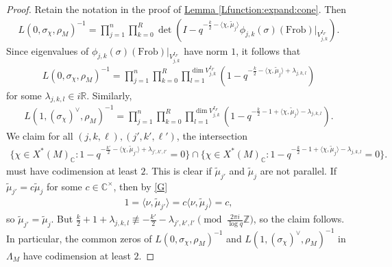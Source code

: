 \documentclass[10pt]{amsart}
\theoremstyle{definition}
\numberwithin{equation}{section}
\numberwithin{equation}{subsection}
\newcommand{\ZZ}{\mathbb{Z}}
\newcommand{\RR}{\mathbb{R}}
\newcommand{\CC}{\mathbb{C}}
\begin{document}
\begin{proof}
    Retain the notation in the proof of \hyperref[Lfunction:expand:cone]{Lemma \ref{Lfunction:expand:cone}}. Then
\begin{align*}
    L(0,\sigma_\chi,\rho_M)^{-1} = \prod_{j=1}^n\prod_{k=0}^R \det\left(I - q^{-\frac{k}{2}-\langle \chi,\widetilde{\mu}_j\rangle}\phi_{j,k}(\sigma)(\mathrm{Frob})\big|_{V_{j,k}^{I_F}}\right).
\end{align*}
Since eigenvalues of $\phi_{j,k}(\sigma)(\mathrm{Frob})\big|_{V_{j,k}^{I_F}}$ have norm $1$, it follows that
\begin{align*}
    L(0,\sigma_\chi,\rho_M)^{-1} = \prod_{j=1}^n\prod_{k=0}^R \prod_{l=1}^{\dim V_{j,k}^{I_F}} (1-q^{-\frac{k}{2}-\langle \chi,\widetilde{\mu}_j\rangle+\lambda_{j,k,l}})
\end{align*}
for some $\lambda_{j,k,l}\in i\RR$. Similarly,
\begin{align*}
    L(1,(\sigma_\chi)^\vee,\rho_M)^{-1} = \prod_{j=1}^n\prod_{k=0}^R \prod_{l=1}^{\dim V_{j,k}^{I_F}} (1-q^{-\frac{k}{2}-1+\langle \chi,\widetilde{\mu}_j\rangle-\lambda_{j,k,l}}).
\end{align*}
We claim for all $(j,k,\ell),(j',k',\ell')$, the intersection
\begin{align*}
    \{\chi\in X^*(M)_\CC:1 - q^{-\frac{k'}{2}-\langle \chi,\widetilde{\mu}_{j'}\rangle+\lambda_{j',k',l'}}=0\} \cap \{\chi\in X^*(M)_\CC :1 - q^{-\frac{k}{2}-1+\langle \chi,\widetilde{\mu}_j\rangle-\lambda_{j,k,l}}= 0\}.
\end{align*}
must have codimension at least $2$. This is clear if $\widetilde{\mu}_{j'}$ and $\widetilde{\mu}_j$ are not parallel. If $\widetilde{\mu}_{j'} = c \widetilde{\mu}_{j}$ for some $c\in \CC^\times$, then by \eqref{G}
\begin{align*}
    1 = \langle\nu,\widetilde{\mu}_{j'}\rangle = c\langle\nu,\widetilde{\mu}_{j}\rangle = c,
\end{align*}
so $\widetilde{\mu}_{j'} = \widetilde{\mu}_{j}$. But $\frac{k}{2} + 1 +\lambda_{j,k,l} \not\equiv -\frac{k'}{2} - \lambda_{j',k',l'}\pmod{\frac{2\pi i}{\log q}\ZZ}$, so the claim follows.
In particular, the common zeros of $L(0,\sigma_\chi,\rho_M)^{-1}$ and $L(1,(\sigma_{\chi})^\lor,\rho_M)^{-1}$ in $\Lambda_M$ have codimension at least $2$.
\end{proof}
\end{document}
